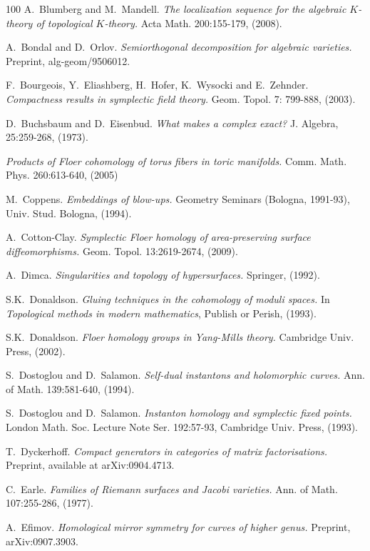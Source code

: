 \documentclass[reqno,10pt]{amsart}
\numberwithin{equation}{section}
\theoremstyle{remark}
\begin{document}
\begin{thebibliography}{100}
A.~Blumberg and M.~Mandell.
\emph{The localization sequence for the algebraic $K$-theory of topological $K$-theory.}
Acta Math. 200:155-179, (2008).

A.~Bondal and D.~Orlov.
\emph{Semiorthogonal decomposition for algebraic varieties.}
Preprint, alg-geom/9506012.

F.~Bourgeois, Y.~Eliashberg, H.~Hofer, K.~Wysocki and E.~Zehnder.
\emph{Compactness results in symplectic field theory.}
Geom. Topol. 7: 799-888, (2003).

D.~Buchsbaum and D.~Eisenbud.
\emph{What makes a complex exact?}
J. Algebra, 25:259-268, (1973).

\emph{Products of Floer cohomology of torus fibers in toric manifolds.}
Comm. Math. Phys. 260:613-640, (2005)


M.~Coppens.
\emph{Embeddings of blow-ups.}
Geometry Seminars (Bologna, 1991-93), Univ. Stud. Bologna, (1994).

A.~Cotton-Clay.
\emph{Symplectic Floer homology of area-preserving surface diffeomorphisms.}
Geom. Topol. 13:2619-2674, (2009).

A.~Dimca.
\emph{Singularities and topology of hypersurfaces.}
Springer, (1992). 

S.K.~Donaldson.
\emph{Gluing techniques in the cohomology of moduli spaces.}
In \emph{Topological methods in modern mathematics}, Publish or Perish, (1993). 

S.K.~Donaldson.
\emph{Floer homology groups in Yang-Mills theory.}
Cambridge Univ. Press, (2002).

S.~Dostoglou and D.~Salamon.
\emph{Self-dual instantons and holomorphic curves.}
Ann. of Math. 139:581-640, (1994).

S.~Dostoglou and D.~Salamon.
\emph{Instanton homology and symplectic fixed points.}
London Math. Soc. Lecture Note Ser. 192:57-93, Cambridge Univ. Press, (1993).

T.~Dyckerhoff.
\emph{Compact generators in categories of matrix factorisations.}
Preprint, available at arXiv:0904.4713.

C.~Earle.
\emph{Families of Riemann surfaces and Jacobi varieties.}
Ann. of Math. 107:255-286, (1977).


A.~Efimov.
\emph{Homological mirror symmetry for curves of higher genus.}
Preprint, arXiv:0907.3903.


\end{thebibliography}
\end{document}
